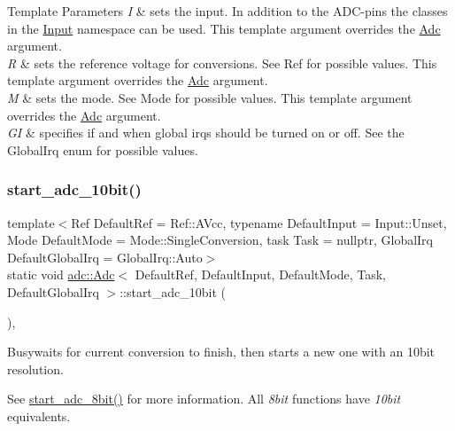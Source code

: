 \begin{DoxyTemplParams}{Template Parameters}
{\em I} & sets the input. In addition to the A\+D\+C-\/pins the classes in the \hyperlink{namespaceadc_1_1Input}{Input} namespace can be used. This template argument overrides the \hyperlink{classadc_1_1Adc}{Adc} argument. \\
\hline
{\em R} & sets the reference voltage for conversions. See Ref for possible values. This template argument overrides the \hyperlink{classadc_1_1Adc}{Adc} argument. \\
\hline
{\em M} & sets the mode. See Mode for possible values. This template argument overrides the \hyperlink{classadc_1_1Adc}{Adc} argument. \\
\hline
{\em GI} & specifies if and when global irqs should be turned on or off. See the Global\+Irq enum for possible values. \\
\hline
\end{DoxyTemplParams}
\hypertarget{classadc_1_1Adc_a81899906398fa2ec02b5aefcbe5f67e8}{}\label{classadc_1_1Adc_a81899906398fa2ec02b5aefcbe5f67e8} 
\subsubsection{\texorpdfstring{start\+\_\+adc\+\_\+10bit()}{start\_adc\_10bit()}}
{\footnotesize\ttfamily template$<$Ref Default\+Ref = Ref\+::\+A\+Vcc, typename Default\+Input  = Input\+::\+Unset, Mode Default\+Mode = Mode\+::\+Single\+Conversion, task Task = nullptr, Global\+Irq Default\+Global\+Irq = Global\+Irq\+::\+Auto$>$ \\
static void \hyperlink{classadc_1_1Adc}{adc\+::\+Adc}$<$ Default\+Ref, Default\+Input, Default\+Mode, Task, Default\+Global\+Irq $>$\+::start\+\_\+adc\+\_\+10bit (\begin{DoxyParamCaption}{ }\end{DoxyParamCaption})\hspace{0.3cm}{\ttfamily [inline]}, {\ttfamily [static]}}



Busywaits for current conversion to finish, then starts a new one with an 10bit resolution. 

See \hyperlink{classadc_1_1Adc_ad9e5ec858366e50739d7e1beef02d729}{start\+\_\+adc\+\_\+8bit()} for more information. All {\itshape 8bit} functions have {\itshape 10bit} equivalents. \hypertarget{classadc_1_1Adc_ad9e5ec858366e50739d7e1beef02d729}{}\label{classadc_1_1Adc_ad9e5ec858366e50739d7e1beef02d729} 

